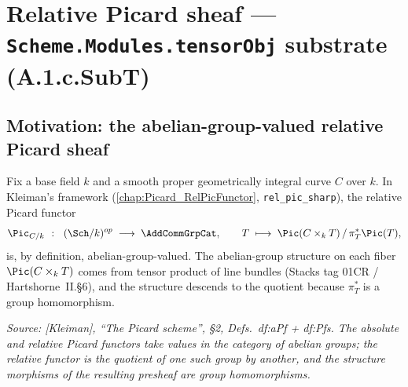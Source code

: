 \chapter{Relative Picard sheaf --- \texttt{Scheme.Modules.tensorObj} substrate (A.1.c.SubT)}
\label{chap:Picard_TensorObjSubstrate}

\section{Motivation: the abelian-group-valued relative Picard sheaf}
\label{sec:tensorobj_motivation}

Fix a base field \(k\) and a smooth proper geometrically integral curve \(C\) over
\(k\). In Kleiman's framework (\cref{chap:Picard_RelPicFunctor},
\texttt{rel\_pic\_sharp}), the relative Picard functor
\[
  \Pic_{C/k} \;\;\colon\;\; (\Sch/k)^{op} \;\longrightarrow\; \AddCommGrpCat,
  \qquad
  T \;\longmapsto\; \Pic(C \times_k T) \, / \, \pi_T^* \Pic(T),
\]
is, by definition, abelian-group-valued. The abelian-group structure on each
fiber \(\Pic(C \times_k T)\) comes from tensor product of line bundles
(Stacks tag 01CR / Hartshorne~II.\S 6), and the structure descends to the
quotient because \(\pi_T^*\) is a group homomorphism.

\textit{Source: [Kleiman], ``The Picard scheme'', \S 2, Defs.~df:aPf + df:Pfs.
The absolute and relative Picard functors take values in the category of
abelian groups; the relative functor is the quotient of one such group by
another, and the structure morphisms of the resulting presheaf are group
homomorphisms.}

